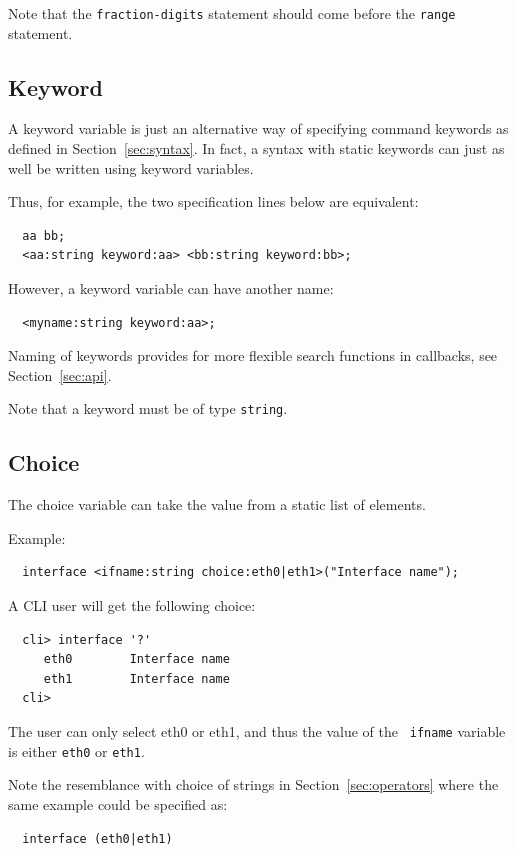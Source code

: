 \documentclass[a4paper, 10pt] {article}
\begin{document}
Note that the {\tt fraction-digits} statement should come before the {\tt range} statement.

\subsection{Keyword}
\label{sec:keyword}

A keyword variable is just an alternative way of specifying command
keywords as defined in Section~\ref{sec:syntax}. In fact, a syntax
with static keywords can just as well be written using keyword
variables. 

Thus, for example, the two specification lines below are equivalent:
\begin{verbatim}
  aa bb;
  <aa:string keyword:aa> <bb:string keyword:bb>;
\end{verbatim}

However, a keyword variable can have another name:
\begin{verbatim}
  <myname:string keyword:aa>;
\end{verbatim}

Naming of keywords provides for more flexible search functions
in callbacks, see Section~\ref{sec:api}.

Note that a keyword must be of type {\tt string}.

\subsection{Choice}

The choice variable can take the value from a static list of elements.

Example:
\begin{verbatim}
  interface <ifname:string choice:eth0|eth1>("Interface name");
\end{verbatim}

A CLI user will get the following choice:
\begin{verbatim}
  cli> interface '?'
     eth0        Interface name
     eth1        Interface name
  cli>
\end{verbatim}
The user can only select eth0 or eth1, and thus the value of the {\tt
  ifname} variable is either {\tt eth0} or {\tt eth1}.

Note the resemblance with choice of strings in
Section~\ref{sec:operators} where the same example could be specified
as:
\begin{verbatim}
  interface (eth0|eth1)
\end{verbatim}
\end{document}
